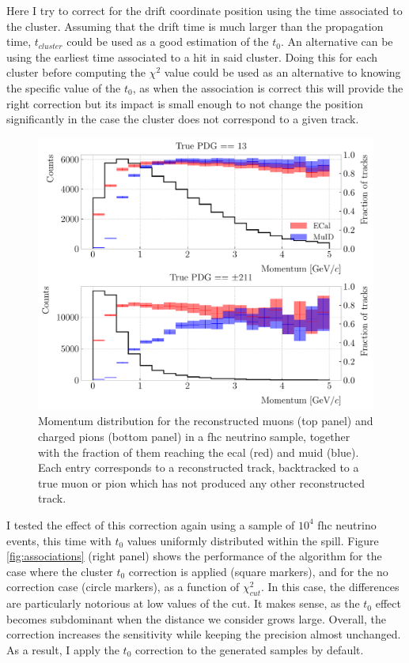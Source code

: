 Here I try to correct for the drift coordinate position using the time associated to the cluster. Assuming that the drift time is much larger than the propagation time, $t_{cluster}$ could be used as a good estimation of the $t_{0}$. An alternative can be using the earliest time associated to a hit in said cluster. Doing this for each cluster before computing the $\chi^{2}$ value could be used as an alternative to knowing the specific value of the $t_{0}$, as when the association is correct this will provide the right correction but its impact is small enough to not change the position significantly in the case the cluster does not correspond to a given track.

\begin{figure}[t]
	\centering
	\includegraphics[width=.80\linewidth]{Images/GArSoft_PID/BDT/fraction_vs_preco_no_duplicates.pdf}
	\caption[Momentum distribution for the reconstructed muons and charged pions in a \gls{fhc} sample, together with the fraction of them reaching the \gls{ecal} and \gls{muid}.]{Momentum distribution for the reconstructed muons (top panel) and charged pions (bottom panel) in a \gls{fhc} neutrino sample, together with the fraction of them reaching the \gls{ecal} (red) and \gls{muid} (blue). Each entry corresponds to a reconstructed track, backtracked to a true muon or pion which has not produced any other reconstructed track.}
	\label{fig:fraction_particles_ecal_muid}
\end{figure}

I tested the effect of this correction again using a sample of $10^{4}$ \gls{fhc} neutrino events, this time with $t_{0}$ values uniformly distributed within the spill. Figure \ref{fig:associations} (right panel) shows the performance of the algorithm for the case where the cluster $t_{0}$ correction is applied (square markers), and for the no correction case (circle markers), as a function of $\chi^{2}_{cut}$. In this case, the differences are particularly notorious at low values of the cut. It makes sense, as the $t_{0}$ effect becomes subdominant when the distance we consider grows large. Overall, the correction increases the sensitivity while keeping the precision almost unchanged. As a result, I apply the $t_{0}$ correction to the generated samples by default.

